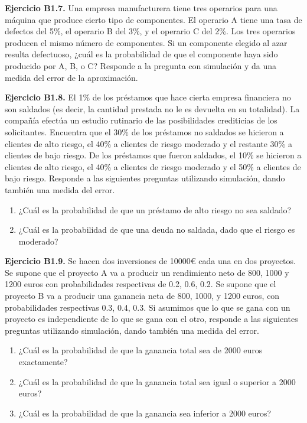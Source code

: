 \documentclass[
]{book}
\providecommand{\tightlist}{%
  \setlength{\itemsep}{0pt}\setlength{\parskip}{0pt}}
\theoremstyle{definition}
\theoremstyle{definition}
\theoremstyle{definition}
\theoremstyle{definition}
\theoremstyle{remark}
\begin{document}
\textbf{Ejercicio B1.7.} Una empresa manufacturera tiene tres operarios para una máquina que produce cierto tipo de componentes. El operario A tiene una tasa de defectos del 5\%, el operario B del 3\%, y el operario C del 2\%. Los tres operarios producen el mismo número de componentes. Si un componente elegido al azar resulta defectuoso, ¿cuál es la probabilidad de que el componente haya sido producido por A, B, o C? Responde a la pregunta con simulación y da una medida del error de la aproximación.

\textbf{Ejercicio B1.8.} El 1\% de los préstamos que hace cierta empresa financiera no son saldados (es decir, la cantidad prestada no le es devuelta en su totalidad). La compañía efectúa un estudio rutinario de las posibilidades crediticias de los solicitantes. Encuentra que el 30\% de los préstamos no saldados se hicieron a clientes de alto riesgo, el 40\% a clientes de riesgo moderado y el restante 30\% a clientes de bajo riesgo. De los préstamos que fueron saldados, el 10\% se hicieron a clientes de alto riesgo, el 40\% a clientes de riesgo moderado y el 50\% a clientes de bajo riesgo. Responde a las siguientes preguntas utilizando simulación, dando también una medida del error.

\begin{enumerate}
\def\labelenumi{\arabic{enumi}.}
\tightlist
\item
  ¿Cuál es la probabilidad de que un préstamo de alto riesgo no sea saldado?
\item
  ¿Cuál es la probabilidad de que una deuda no saldada, dado que el riesgo es moderado?
\end{enumerate}

\textbf{Ejercicio B1.9.} Se hacen dos inversiones de 10000€ cada una en dos proyectos. Se supone que el proyecto A va a producir un rendimiento neto de 800, 1000 y 1200 euros con probabilidades respectivas de 0.2, 0.6, 0.2. Se supone que el proyecto B va a producir una ganancia neta de 800, 1000, y 1200 euros, con probabilidades respectivas 0.3, 0.4, 0.3. Si asumimos que lo que se gana con un proyecto es independiente de lo que se gana con el otro, responde a las siguientes preguntas utilizando simulación, dando también una medida del error.

\begin{enumerate}
\def\labelenumi{\arabic{enumi}.}
\tightlist
\item
  ¿Cuál es la probabilidad de que la ganancia total sea de 2000 euros exactamente?
\item
  ¿Cuál es la probabilidad de que la ganancia total sea igual o superior a 2000 euros?
\item
  ¿Cuál es la probabilidad de que la ganancia sea inferior a 2000 euros?
\end{enumerate}
\end{document}
